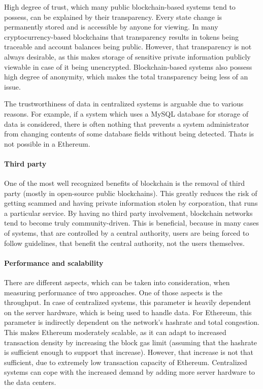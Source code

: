 High degree of trust, which many public blockchain-based systems tend to possess, can be explained by their transparency. Every state change is permanently stored and is accessible by anyone for viewing. In many cryptocurrency-based blockchains that transparency results in tokens being traceable and account balances being public. However, that transparency is not always desirable, as this makes storage of sensitive private information publicly viewable in case of it being unencrypted. Blockchain-based systems also possess high degree of anonymity, which makes the total transparency being less of an issue.

The trustworthiness of data in centralized systems is arguable due to various reasons. For example, if a system which uses a MySQL database for storage of data is considered, there is often nothing that prevents a system administrator from changing contents of some database fields without being detected. Thats is not possible in a Ethereum.

\paragraph{Third party}
One of the most well recognized benefits of blockchain is the removal of third party (mostly in open-source public blockchains). This greatly reduces the risk of getting scammed and having private information stolen by corporation, that runs a particular service. By having no third party involvement, blockchain networks tend to become truly community-driven. This is beneficial, because in many cases of systems, that are controlled by a central authority, users are being forced to follow guidelines, that benefit the central authority, not the users themselves.

\paragraph{Performance and scalability}
There are different aspects, which can be taken into consideration, when measuring performance of two approaches. One of those aspects is the throughput. In case of centralized systems, this parameter is heavily dependent on the server hardware, which is being used to handle data. For Ethereum, this parameter is indirectly dependent on the network's hashrate and total congestion. This makes Ethereum moderately scalable, as it can adapt to increased transaction density by increasing the block gas limit (assuming that the hashrate is sufficient enough to support that increase). However, that increase is not that sufficient, due to extremely low transaction capacity of Ethereum. Centralized systems can cope with the increased demand by adding more server hardware to the data centers.


